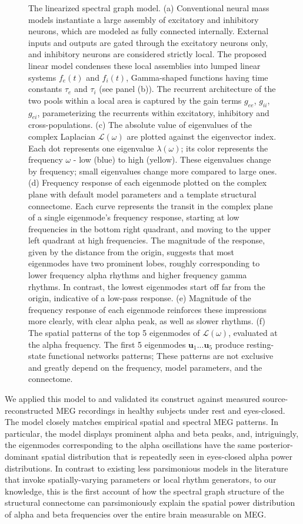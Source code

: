 \begin{figure}[htbp]
    \caption{The linearized spectral graph model. (a) Conventional neural mass models instantiate a large assembly of excitatory and inhibitory neurons, which are modeled as fully connected internally. External inputs and outputs are gated through the excitatory neurons only, and inhibitory neurons are considered strictly local. The proposed linear model condenses these local assemblies into lumped linear systems $f_{e}(t)$ and $f_{i}(t)$, Gamma-shaped functions having time constants $\tau_e$ and $\tau_i$ (see panel (b)). The recurrent architecture of the two pools within a local area is captured by the gain terms $g_{ee}$, $g_{ii}$, $g_{ei}$, parameterizing the recurrents within excitatory, inhibitory and cross-populations. (c) The absolute value of eigenvalues of the complex Laplacian $\bm{\mathcal{L}}(\omega)$ are plotted against the eigenvector index. Each dot represents one eigenvalue  $\lambda(\omega)$; its color represents the frequency $\omega$ - low (blue) to high (yellow). These eigenvalues change by frequency; small eigenvalues change more compared to large ones. (d) Frequency response of each eigenmode plotted on the complex plane with default model parameters and a template structural connectome. Each curve represents the transit in the complex plane of a single eigenmode's frequency response, starting at low frequencies in the bottom right quadrant, and moving to the upper left quadrant at high frequencies. The magnitude of the response, given by the distance from the origin, suggests that most eigenmodes have two prominent lobes, roughly corresponding to lower frequency alpha rhythms and higher frequency gamma rhythms. In contrast, the lowest eigenmodes start off far from the origin, indicative of a low-pass response. (e) Magnitude of the frequency response of each eigenmode reinforces these impressions more clearly, with clear alpha peak, as well as slower rhythms. (f) The spatial patterns of the top 5 eigenmodes of $\bm{\mathcal{L}}(\omega)$, evaluated at the alpha frequency. The first 5 eigenmodes $\bm{u}_1 ... \bm{u}_5$ produce resting-state functional networks patterns; These patterns are not exclusive and greatly depend on the frequency,  model parameters, and the connectome.}
    \label{fig:sgmodel}
\end{figure}

We applied this model to and validated its construct against measured
source-reconstructed MEG recordings in healthy subjects under rest and
eyes-closed. The model closely matches empirical spatial and spectral
MEG patterns. In particular, the model displays prominent alpha and beta
peaks, and, intriguingly, the eigenmodes corresponding to the alpha
oscillations have the same posterior-dominant spatial distribution that
is repeatedly seen in eyes-closed alpha power distributions. In contrast
to existing less parsimonious models in the literature that invoke
spatially-varying parameters or local rhythm generators, to our
knowledge, this is the first account of how the spectral graph structure
of the structural connectome can parsimoniously explain the spatial
power distribution of alpha and beta frequencies over the entire brain
measurable on MEG.

